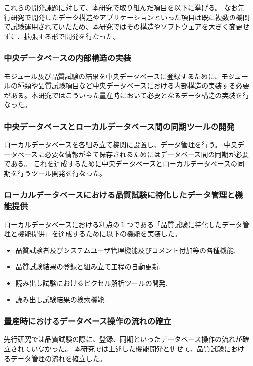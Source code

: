 これらの開発課題に対して、本研究で取り組んだ項目を以下に挙げる。
なお先行研究で開発したデータ構造やアプリケーションといった項目は既に複数の機関で試験運用されていたため、本研究ではその構造やソフトウェアを大きく変更せずに、拡張する形で開発を行なった。

\subsubsection{中央データベースの内部構造の実装}
モジュール及び品質試験の結果を中央データベースに登録するために、モジュールの種類や品質試験項目など中央データベースにおける内部構造の実装する必要がある。本研究ではこういった量産時において必要となるデータ構造の実装を行なった。

\subsubsection{中央データベースとローカルデータベース間の同期ツールの開発}
ローカルデータベースを各組み立て機関に設置し、データ管理を行う。
中央データベースに必要な情報が全て保存されるためにはデータベース間の同期が必要である。
これを達成するために中央データベースとローカルデータベースの同期を行うツール開発を行なった。

\subsubsection{ローカルデータベースにおける品質試験に特化したデータ管理と機能提供}
ローカルデータベースにおける利点の１つである「品質試験に特化したデータ管理と機能提供」を達成するために以下の機能を実装した。
\begin{itemize}
  \item 品質試験者及びシステムユーザ管理機能及びコメント付加等の各種機能.
  \item 品質試験結果の登録と組み立て工程の自動更新.
  \item 読み出し試験におけるピクセル解析ツールの開発.
  \item 読み出し試験結果の検索機能.
\end{itemize}

\subsubsection{量産時におけるデータベース操作の流れの確立}
先行研究では品質試験の際に、登録、同期といったデータベース操作の流れが確立されていなかった。
本研究では上述した機能開発と併せて、品質試験におけるデータ管理の流れを確立した。

